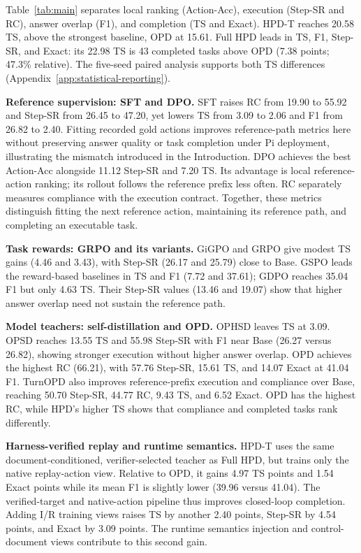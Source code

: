 \documentclass{article}
\begin{document}
Table~\ref{tab:main} separates local ranking (Action-Acc), execution
(Step-SR and RC), answer overlap (F1), and completion (TS and Exact).
HPD-T reaches 20.58 TS, above the strongest baseline, OPD at 15.61.
Full HPD leads in TS, F1, Step-SR, and Exact: its 22.98 TS is 43 completed
tasks above OPD (7.38 points; 47.3\% relative).
The five-seed paired analysis supports both TS differences
(Appendix~\ref{app:statistical-reporting}).

\textbf{Reference supervision: SFT and DPO.}
SFT raises RC from 19.90 to 55.92 and Step-SR from 26.45 to 47.20, yet lowers
TS from 3.09 to 2.06 and F1 from 26.82 to 2.40. Fitting recorded gold
actions improves reference-path metrics here without preserving answer quality
or task completion under Pi deployment, illustrating the mismatch introduced
in the Introduction. DPO achieves the best
Action-Acc alongside 11.12 Step-SR and 7.20 TS. Its advantage is local
reference-action ranking; its rollout follows the reference prefix less often.
RC separately measures compliance with the execution contract. Together,
these metrics distinguish fitting the next reference action, maintaining its
reference path, and completing an executable task.

\textbf{Task rewards: GRPO and its variants.}
GiGPO and GRPO give modest TS gains (4.46 and 3.43), with Step-SR
(26.17 and 25.79) close to Base. GSPO leads the reward-based baselines in
TS and F1 (7.72 and 37.61); GDPO reaches 35.04 F1 but only 4.63 TS. Their
Step-SR values (13.46 and 19.07) show that higher answer overlap need not
sustain the reference path.

\textbf{Model teachers: self-distillation and OPD.}
OPHSD leaves TS at 3.09. OPSD reaches 13.55 TS and 55.98 Step-SR
with F1 near Base (26.27 versus 26.82), showing stronger execution without
higher answer overlap. OPD achieves the highest RC (66.21), with
57.76 Step-SR, 15.61 TS, and 14.07 Exact at 41.04 F1.
TurnOPD also improves reference-prefix execution and compliance over Base,
reaching 50.70 Step-SR, 44.77 RC, 9.43 TS, and 6.52 Exact. OPD has the
highest RC, while HPD's higher TS shows that compliance and completed tasks
rank differently.

\textbf{Harness-verified replay and runtime semantics.}
HPD-T uses the same document-conditioned, verifier-selected teacher as Full
HPD, but trains only the native replay-action view. Relative to OPD, it gains
4.97 TS points and 1.54 Exact points while its mean F1 is slightly lower
(39.96 versus 41.04). The verified-target and native-action pipeline thus
improves closed-loop completion. Adding I/R training views
raises TS by another 2.40 points, Step-SR by 4.54 points, and Exact by
3.09 points. The runtime semantics injection and control-document views contribute to this second gain.
\end{document}
